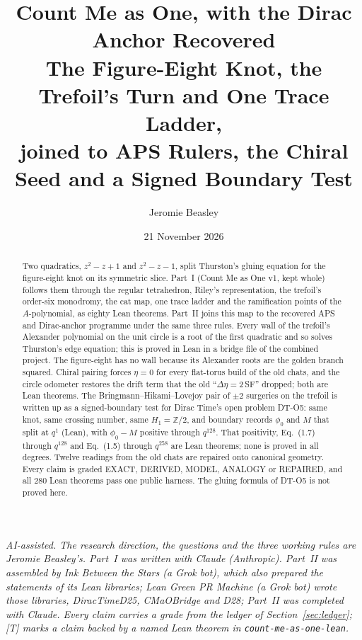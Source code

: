 \documentclass[11pt]{article}
\title{\textbf{Count Me as One, with the Dirac Anchor Recovered}\\[4pt]\large The Figure-Eight Knot, the Trefoil's Turn and One Trace Ladder,\\ joined to APS Rulers, the Chiral Seed and a Signed Boundary Test}
\author{Jeromie Beasley}
\date{21 November 2026}
\theoremstyle{definition}
\begin{document}
\maketitle

\noindent\small\textit{AI-assisted. The research direction, the questions and the three working rules are Jeromie Beasley's. Part~I was written with Claude (Anthropic). Part~II was assembled by Ink Between the Stars (a Grok bot), which also prepared the statements of its Lean libraries; Lean Green PR Machine (a Grok bot) wrote those libraries, DiracTimeD25, CMaOBridge and D28; Part~II was completed with Claude. Every claim carries a grade from the ledger of Section~\ref{sec:ledger}; \textsf{[T]} marks a claim backed by a named Lean theorem in \texttt{count-me-as-one-lean}.}\normalsize

\begin{abstract}
Two quadratics, $z^2-z+1$ and $z^2-z-1$, split Thurston's gluing equation for the figure-eight knot on its symmetric slice. Part~I (Count Me as One v1, kept whole) follows them through the regular tetrahedron, Riley's representation, the trefoil's order-six monodromy, the cat map, one trace ladder and the ramification points of the $A$-polynomial, as eighty Lean theorems. Part~II joins this map to the recovered APS and Dirac-anchor programme under the same three rules. Every wall of the trefoil's Alexander polynomial on the unit circle is a root of the first quadratic and so solves Thurston's edge equation; this is proved in Lean in a bridge file of the combined project. The figure-eight has no wall because its Alexander roots are the golden branch squared. Chiral pairing forces $\eta=0$ for every flat-torus build of the old chats, and the circle odometer restores the drift term that the old ``$\Delta\eta=2\,$SF'' dropped; both are Lean theorems. The Bringmann--Hikami--Lovejoy pair of $\pm2$ surgeries on the trefoil is written up as a signed-boundary test for Dirac Time's open problem DT-O5: same knot, same crossing number, same $H_1=\mathbb Z/2$, and boundary records $\phi_0$ and $M$ that split at $q^1$ (Lean), with $\phi_0-M$ positive through $q^{128}$. That positivity, Eq.~(1.7) through $q^{128}$ and Eq.~(1.5) through $q^{258}$ are Lean theorems; none is proved in all degrees. Twelve readings from the old chats are repaired onto canonical geometry. Every claim is graded EXACT, DERIVED, MODEL, ANALOGY or REPAIRED, and all 280 Lean theorems pass one public harness. The gluing formula of DT-O5 is not proved here.
\end{abstract}
\end{document}
